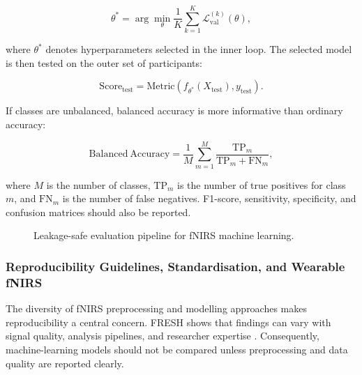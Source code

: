 \begin{equation}
\theta^*
=
\arg\min_{\theta}
\frac{1}{K}
\sum_{k=1}^{K}
\mathcal{L}_{\text{val}}^{(k)}(\theta),
\end{equation}

where \(\theta^*\) denotes hyperparameters selected in the inner loop. The selected model is then
tested on the outer set of participants:

\begin{equation}
\mathrm{Score}_{\text{test}}=
\mathrm{Metric}(f_{\theta^*}(X_{\text{test}}),y_{\text{test}}).
\end{equation}

If classes are unbalanced, balanced accuracy is more informative than ordinary accuracy:

\begin{equation}
\mathrm{Balanced\ Accuracy}=
\frac{1}{M}
\sum_{m=1}^{M}
\frac{\mathrm{TP}_m}{\mathrm{TP}_m+\mathrm{FN}_m},
\end{equation}

where \(M\) is the number of classes, \(\mathrm{TP}_m\) is the number of true positives for class
\(m\), and \(\mathrm{FN}_m\) is the number of false negatives. F1-score, sensitivity, specificity,
and confusion matrices should also be reported.

\begin{figure}[h]
\centering
{}
\caption{Leakage-safe evaluation pipeline for fNIRS machine learning.}
\label{fig:leakage_pipeline}
\end{figure}

\subsubsection{Reproducibility Guidelines, Standardisation, and Wearable fNIRS}

The diversity of fNIRS preprocessing and modelling approaches makes reproducibility a central
concern. FRESH shows that findings can vary with signal quality, analysis pipelines, and researcher
expertise \cite{Yucel2025}. Consequently, machine-learning models should not be compared unless
preprocessing and data quality are reported clearly.

